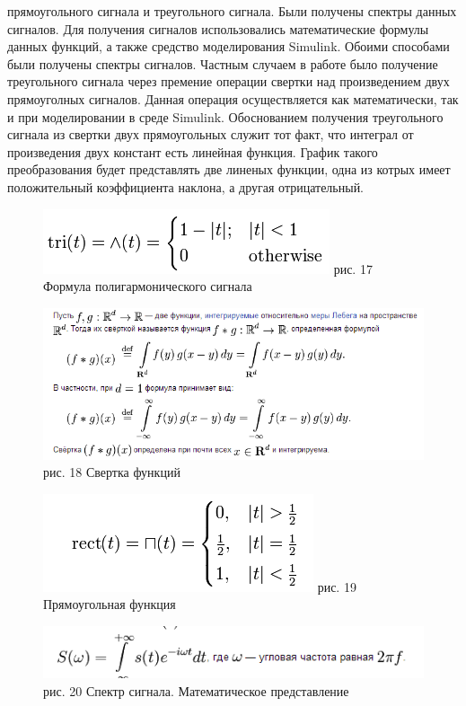 \documentclass[10pt,a4paper]{report}
\begin{document}
 прямоугольного сигнала и треугольного сигнала. Были получены спектры данных сигналов. Для получения сигналов использовались математические формулы данных функций, а также средство моделирования Simulink. Обоими способами были получены спектры сигналов. Частным случаем в работе было получение треугольного сигнала через премение операции свертки над произведением двух прямоуголных сигналов. Данная операция осуществляется как математически, так и при моделировании в среде Simulink.
Обоснованием получения треугольного сигнала из свертки двух прямоугольных служит тот факт, что интеграл от произведения двух констант есть линейная функция. График такого преобразования будет представлять две линеных функции, одна из котрых имеет положительный коэффициента наклона, а другая отрицательный.
\begin{figure}
\begin{center}
\includegraphics[angle=0, scale = 0.8]{17.png}\newline
рис. 17    Формула полигармонического сигнала\newline
\end{center}
\end{figure}
\begin{figure}
\begin{center}
\includegraphics[angle=0, scale = 0.8]{18.png}\newline
рис. 18   Свертка функций
\end{center}
\end{figure}
\begin{figure}
\begin{center}
\includegraphics[angle=0, scale = 0.8]{19.png}\newline
рис. 19    Прямоугольная функция
\end{center}
\end{figure}
\begin{figure}
\begin{center}
\includegraphics[angle=0, scale = 0.8]{20.png}\newline
рис. 20    Спектр сигнала. Математическое представление
\end{center}
\end{figure}
\end{document}
